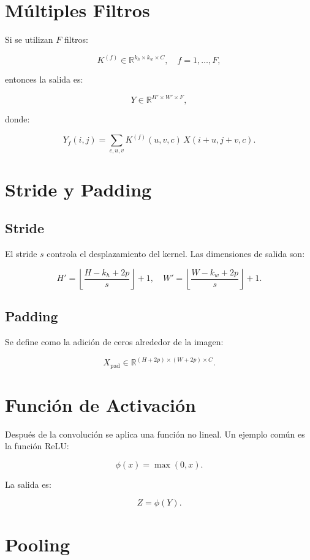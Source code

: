 \documentclass[
  letterpaper,
  DIV=11,
  numbers=noendperiod]{scrartcl}
\begin{document}
\section{Múltiples Filtros}\label{muxfaltiples-filtros}

Si se utilizan \(F\) filtros:

\[
K^{(f)} \in \mathbb{R}^{k_h \times k_w \times C}, \quad f = 1,\dots,F,
\]

entonces la salida es:

\[
Y \in \mathbb{R}^{H' \times W' \times F},
\]

donde:

\[
Y_f(i,j) = \sum_{c,u,v} K^{(f)}(u,v,c)\, X(i+u, j+v, c).
\]

\section{Stride y Padding}\label{stride-y-padding}

\subsection{Stride}\label{stride}

El stride \(s\) controla el desplazamiento del kernel. Las dimensiones
de salida son:

\[
H' = \left\lfloor \frac{H - k_h + 2p}{s} \right\rfloor + 1, \quad
W' = \left\lfloor \frac{W - k_w + 2p}{s} \right\rfloor + 1.
\]

\subsection{Padding}\label{padding}

Se define como la adición de ceros alrededor de la imagen:

\[
X_{\text{pad}} \in \mathbb{R}^{(H+2p)\times(W+2p)\times C}.
\]

\section{Función de Activación}\label{funciuxf3n-de-activaciuxf3n}

Después de la convolución se aplica una función no lineal. Un ejemplo
común es la función ReLU:

\[
\phi(x) = \max(0,x).
\]

La salida es:

\[
Z = \phi(Y).
\]

\section{Pooling}\label{pooling}
\end{document}
